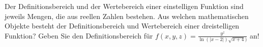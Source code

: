 \item Der Definitionsbereich und der Wertebereich einer einstelligen Funktion sind jeweils Mengen, die aus reellen Zahlen bestehen. Aus welchen mathematischen Objekte besteht der Definitionsbereich und Wertebereich einer dreistelligen Funktion? Geben Sie den Definitionsbereich für $f(x,y,z) = \frac{y^z}{\ln(|x-2|)\sqrt{x+4})}$ an!